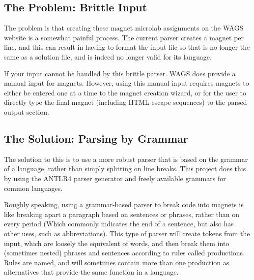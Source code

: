\documentclass[letter,10pt]{article}
\begin{document}

\subsection{The Problem: Brittle Input}

The problem is that creating these magnet microlab assignments on the 
WAGS website is a somewhat painful process. The current parser creates 
a magnet per line, and this can result in having to format the input 
file so that is no longer the same as a solution file, and is indeed no 
longer valid for its language.


If your input cannot be handled by this brittle parser. WAGS does 
provide a manual input for magnets. However, using this manual input 
requires magnets to either be entered one at a time to the magnet 
creation wizard, or for the user to directly type the final magnet 
(including HTML escape sequences) to the parsed output section. 


\subsection{The Solution: Parsing by Grammar}

The solution to this is to use a more robust parser that is based on 
the grammar of a language, rather than simply splitting on line breaks. 
This project does this by using the ANTLR4 parser 
generator\cite{antlr-reference} and freely available grammars for 
common languages\cite{antlr-grammars-project}.

Roughly speaking, using a grammar-based parser to break code into 
magnets is like breaking apart a paragraph based on sentences or 
phrases, rather than on every period (Which commonly indicates the end 
of a sentence, but also has other uses, such as abbreviations). This 
type of parser will create tokens from the input, which are loosely the 
equivalent of words, and then break them into (sometimes nested) 
phrases and sentences according to rules called productions. Rules are 
named, and will sometimes contain more than one production as 
alternatives that provide the same function in a language.
\end{document}
